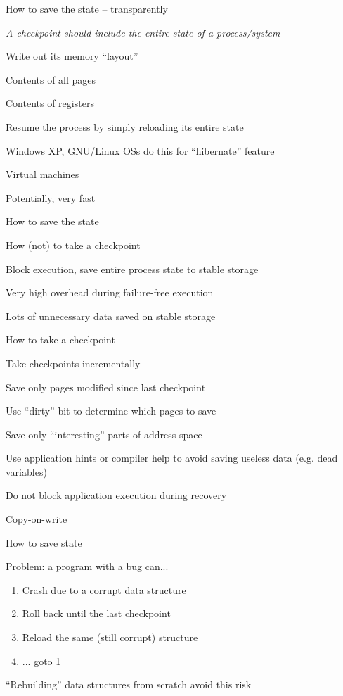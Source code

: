 \begin{frame}{How to save the state -- transparently}
\BIL
	\item  \emph{A checkpoint should include the entire state of a process/system}
		\BI
		\item Write out its memory “layout”
		\item Contents of all pages
		\item Contents of registers
		\EI
	\item Resume the process by simply reloading its entire state
		\BI
		\item Windows XP, GNU/Linux OSs do this for “hibernate” feature
		\item Virtual machines
		\EI
	\item Potentially, very fast
\EIL
\end{frame}

\begin{frame}{How to save the state}
\BIL
	\item How (not) to take a checkpoint
		\BI
		\item Block execution, save entire process state to stable storage
		\item Very high overhead during failure-free execution
		\item Lots of unnecessary data saved on stable storage
		\EI
	\item How to take a checkpoint
	\BI
		\item Take checkpoints incrementally
			\BI
			\item Save only pages modified since last checkpoint
			\item Use “dirty” bit to determine which pages to save
			\EI
		\item Save only “interesting” parts of address space
			\BI
			\item Use application hints or compiler help to avoid saving useless data (e.g. dead variables)
			\EI
		\item Do not block application execution during recovery
			\BI
			\item Copy-on-write	
			\EI
	\EI
\EIL	
\end{frame}

\begin{frame}{How to save state}
\BIL
\item Problem: a program with a bug can...
\begin{enumerate}
\item Crash due to a corrupt data structure
\item Roll back until the last checkpoint
\item Reload the same (still corrupt) structure
\item ... goto 1
\end{enumerate}
\item “Rebuilding” data structures from scratch avoid this risk
\EIL
\end{frame}

